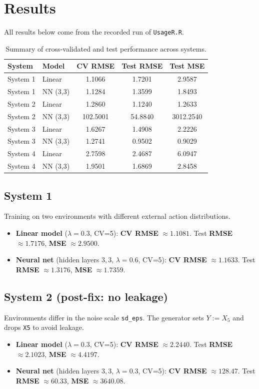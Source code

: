 \documentclass[11pt,a4paper]{article}
\begin{document}
\section{Results}
All results below come from the recorded run of \texttt{UsageR.R}.

\begin{table}[!htbp]
  \centering
  \caption{Summary of cross-validated and test performance across systems.}
  \label{tab:results}
  \begin{tabular}{llccc}
    \toprule
    System & Model & CV RMSE & Test RMSE & Test MSE \\
    \midrule
    System 1 & Linear & 1.1066 & 1.7201 & 2.9587 \\
    System 1 & NN (3,3) & 1.1284 & 1.3599 & 1.8493 \\
    System 2 & Linear & 1.2860 & 1.1240 & 1.2633 \\
    System 2 & NN (3,3) & 102.5001 & 54.8840 & 3012.2540 \\
    System 3 & Linear & 1.6267 & 1.4908 & 2.2226 \\
    System 3 & NN (3,3) & 1.2741 & 0.9502 & 0.9029 \\
    System 4 & Linear & 2.7598 & 2.4687 & 6.0947 \\
    System 4 & NN (3,3) & 1.9501 & 1.6869 & 2.8458 \\
    \bottomrule
  \end{tabular}
\end{table}

\subsection{System 1}
Training on two environments with different external action distributions.
\begin{itemize}
  \item \textbf{Linear model} (\(\lambda=0.3\), CV=5): \textbf{CV RMSE} \(\approx 1.1081\). Test \textbf{RMSE} \(\approx 1.7176\), \textbf{MSE} \(\approx 2.9500\).
  \item \textbf{Neural net} (hidden layers \(3,3\), \(\lambda=0.6\), CV=5): \textbf{CV RMSE} \(\approx 1.1633\). Test \textbf{RMSE} \(\approx 1.3176\), \textbf{MSE} \(\approx 1.7359\).
\end{itemize}

\subsection{System 2 (post-fix: no leakage)}
Environments differ in the noise scale \texttt{sd\_eps}. The generator sets \(Y:=X_5\) and drops \texttt{X5} to avoid leakage.
\begin{itemize}
  \item \textbf{Linear model} (\(\lambda=0.3\), CV=5): \textbf{CV RMSE} \(\approx 2.2440\). Test \textbf{RMSE} \(\approx 2.1023\), \textbf{MSE} \(\approx 4.4197\).
  \item \textbf{Neural net} (hidden layers \(3,3\), \(\lambda=0.3\), CV=5): \textbf{CV RMSE} \(\approx 128.47\). Test \textbf{RMSE} \(\approx 60.33\), \textbf{MSE} \(\approx 3640.08\).
\end{itemize}
\end{document}
